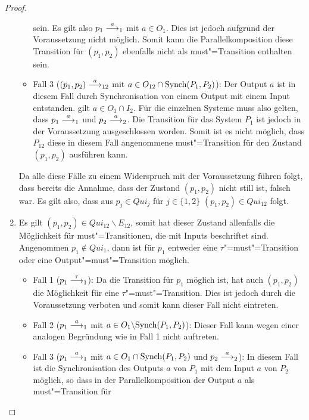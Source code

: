 \begin{proof}
\begin{enumerate}
\begin{itemize}
          sein. Es gilt also \oBdA{} $p_1\must[a]_1$ mit $a\in O_1$. Dies ist
          jedoch aufgrund der Voraussetzung nicht möglich. Somit kann die
          Parallelkomposition diese Transition für $(p_1,p_2)$ ebenfalls nicht
          als must"=Transition enthalten sein.
        \item Fall 3 \big($(p_1,p_2)\must[a]_{12}$ mit $a\in O_{12}\cap\mathrm{Synch}
          (P_1,P_2)$\big): Der Output $a$ ist in diesem Fall durch
          Synchronisation von einem Output mit einem Input entstanden. \OBdA{}
          gilt $a\in O_1\cap I_2$. Für die einzelnen Systeme muss also gelten,
          dass $p_1\must[a]_1$ und $p_2\must[a]_2$. Die Transition für das
          System $P_1$ ist jedoch in der Voraussetzung ausgeschlossen worden.
          Somit ist es nicht möglich, dass $P_{12}$ diese in diesem Fall
          angenommene must"=Transition für den Zustand $(p_1,p_2)$ ausführen
          kann.
      \end{itemize}
      Da alle diese Fälle zu einem Widerspruch mit der Voraussetzung führen
      folgt, dass bereits die Annahme, dass der Zustand $(p_1,p_2)$ nicht still
      ist, falsch war. Es gilt also, dass aus $p_j\in Qui_j$ für $j\in\{1,2\}$
      $(p_1,p_2)\in Qui_{12}$ folgt.
    \item Es gilt $(p_1,p_2)\in Qui_{12}\backslash E_{12}$, somit hat dieser
      Zustand allenfalls die Möglichkeit für must"=Transitionen, die mit Inputs
      beschriftet sind.\\
      Angenommen $p_1\notin Qui _1$, dann ist für $p_1$ entweder eine
      $\tau$"=must"=Transition oder eine Output"=must"=Transition möglich.
      \begin{itemize}
        \item Fall 1 \big($p_1\must[\tau]_1$\big): Da die Transition für $p_1$
          möglich ist, hat auch $(p_1,p_2)$ die Möglichkeit für eine
          $\tau$"=must"=Transition. Dies ist jedoch durch die Voraussetzung
          verboten und somit kann dieser Fall nicht eintreten.
        \item Fall 2 \big($p_1\must[a]_1$ mit $a\in O_1\backslash
          \mathrm{Synch}(P_1,P_2)$\big): Dieser Fall kann wegen einer analogen
          Begründung wie in Fall 1 nicht auftreten.
        \item Fall 3 \big($p_1\must[a]_1$ mit $a\in O_1\cap\mathrm{Synch}(P_1,P_2)$ und
          $p_2\must[a]_2$\big): In diesem Fall ist die Synchronisation des
          Outputs $a$ von $P_1$ mit dem Input $a$ von $P_2$ möglich, so dass in
          der Parallelkomposition der Output $a$ als must"=Transition für

\end{itemize}
\end{enumerate}
\end{proof}
